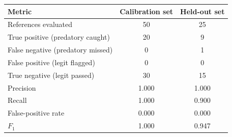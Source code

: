 \begin{tabular}{lcc}
\toprule
 Metric & Calibration set & Held-out set \\
\midrule
 References evaluated & 50 & 25 \\
 True positive (predatory caught) & 20 & 9 \\
 False negative (predatory missed) & 0 & 1 \\
 False positive (legit flagged) & 0 & 0 \\
 True negative (legit passed) & 30 & 15 \\
\midrule
 Precision & 1.000 & 1.000 \\
 Recall & 1.000 & 0.900 \\
 False-positive rate & 0.000 & 0.000 \\
 $F_1$ & 1.000 & 0.947 \\
\bottomrule
\end{tabular}
